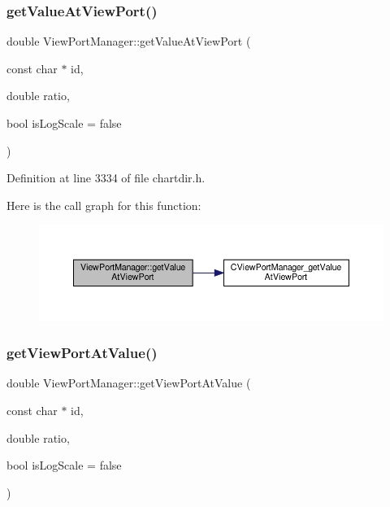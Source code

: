 \subsubsection{\texorpdfstring{get\+Value\+At\+View\+Port()}{getValueAtViewPort()}}
{\footnotesize\ttfamily double View\+Port\+Manager\+::get\+Value\+At\+View\+Port (\begin{DoxyParamCaption}\item[{const char $\ast$}]{id,  }\item[{double}]{ratio,  }\item[{bool}]{is\+Log\+Scale = {\ttfamily false} }\end{DoxyParamCaption})\hspace{0.3cm}{\ttfamily [inline]}}



Definition at line 3334 of file chartdir.\+h.

Here is the call graph for this function\+:
\nopagebreak
\begin{figure}[H]
\begin{center}
\leavevmode
\includegraphics[width=350pt]{class_view_port_manager_a9109a8e0fa981a9443205641d59bb409_cgraph}
\end{center}
\end{figure}
\mbox{\label{class_view_port_manager_a74886ad36dd990d09a70fc480cf9d7d7}} 
\subsubsection{\texorpdfstring{get\+View\+Port\+At\+Value()}{getViewPortAtValue()}}
{\footnotesize\ttfamily double View\+Port\+Manager\+::get\+View\+Port\+At\+Value (\begin{DoxyParamCaption}\item[{const char $\ast$}]{id,  }\item[{double}]{ratio,  }\item[{bool}]{is\+Log\+Scale = {\ttfamily false} }\end{DoxyParamCaption})\hspace{0.3cm}{\ttfamily [inline]}}



